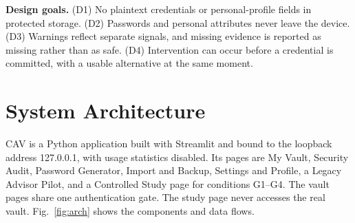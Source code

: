 \documentclass[conference]{IEEEtran}
\begin{document}
\textbf{Design goals.} (D1) No plaintext credentials or personal-profile fields in protected storage. (D2) Passwords and personal attributes never leave the device. (D3) Warnings reflect separate signals, and missing evidence is reported as missing rather than as safe. (D4) Intervention can occur before a credential is committed, with a usable alternative at the same moment.

\section{System Architecture}
CAV is a Python application built with Streamlit and bound to the loopback address 127.0.0.1, with usage statistics disabled. Its pages are My Vault, Security Audit, Password Generator, Import and Backup, Settings and Profile, a Legacy Advisor Pilot, and a Controlled Study page for conditions G1--G4. The vault pages share one authentication gate. The study page never accesses the real vault. Fig.~\ref{fig:arch} shows the components and data flows.
\end{document}
